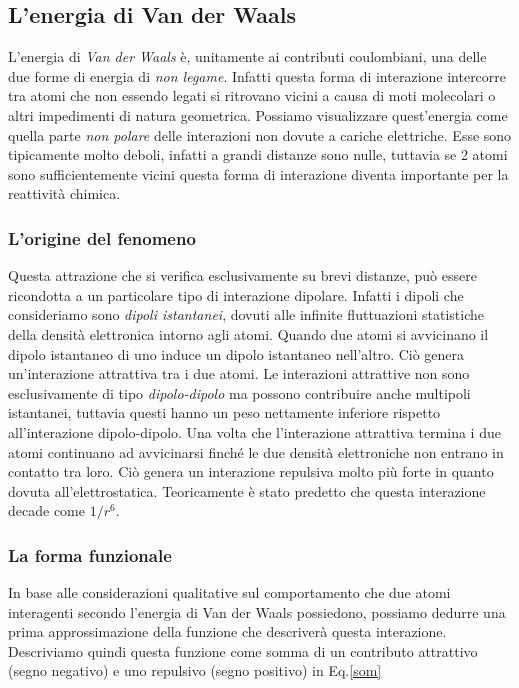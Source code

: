 \documentclass[oneside]{amsbook}
\numberwithin{section}{chapter}
\numberwithin{equation}{section}
\numberwithin{figure}{section}
\begin{document}
\subsection{L'energia di Van der Waals}
L'energia di \emph{Van der Waals} è, unitamente ai contributi coulombiani, una delle due forme di energia di \emph{non legame}. Infatti questa forma di interazione intercorre tra atomi che non essendo legati si ritrovano vicini a causa di moti molecolari o altri impedimenti di natura geometrica. Possiamo visualizzare quest'energia come quella parte \emph{non polare} delle interazioni non dovute a cariche elettriche. Esse sono tipicamente molto deboli, infatti a grandi distanze sono nulle, tuttavia se 2 atomi sono sufficientemente vicini questa forma di interazione diventa importante per la reattività chimica.\\
\subsubsection{L'origine del fenomeno} 
Questa attrazione che si verifica esclusivamente su brevi distanze, può essere ricondotta a un particolare tipo di interazione dipolare. Infatti i dipoli che consideriamo sono \emph{dipoli istantanei}, dovuti alle infinite fluttuazioni statistiche della densità elettronica intorno agli atomi. 
Quando due atomi si avvicinano il dipolo istantaneo di uno induce un dipolo istantaneo nell'altro. Ciò genera un'interazione attrattiva tra i due atomi. Le interazioni attrattive non sono esclusivamente di tipo \emph{dipolo-dipolo} ma possono contribuire anche multipoli istantanei, tuttavia questi hanno un peso nettamente inferiore rispetto all'interazione dipolo-dipolo.
Una volta che l'interazione attrattiva termina i due atomi continuano ad avvicinarsi finché le due densità elettroniche non entrano in contatto tra loro. Ciò genera un interazione repulsiva molto più forte in quanto dovuta all'elettrostatica.
Teoricamente è stato predetto che questa interazione decade come ${1}/{r^6}$.  \\
\subsubsection{La forma funzionale} In base alle considerazioni qualitative sul comportamento che due atomi interagenti secondo l'energia di Van der Waals possiedono, possiamo dedurre una prima approssimazione della funzione che descriverà questa interazione. Descriviamo quindi questa funzione come somma di un contributo attrattivo (segno negativo) e uno repulsivo (segno positivo) in Eq.\ref{som}
\end{document}
